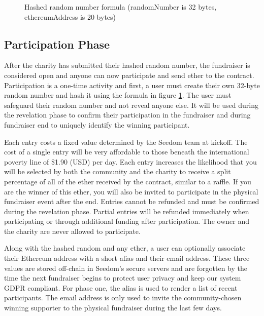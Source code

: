 \documentclass[11pt]{article}
\begin{document}
\begin{figure}[H]
\begin{center}
\caption{Hashed random number formula (randomNumber is 32 bytes, ethereumAddress is 20 bytes)}
\label{figure:hashedRandomNumberFormula}
\end{center}
\end{figure}

\subsection{Participation Phase}

After the charity has submitted their hashed random number, the fundraiser is considered open and anyone can now participate and send ether to the contract. Participation is a one-time activity and first, a user must create their own 32-byte random number and hash it using the formula in figure \ref{figure:hashedRandomNumberFormula}. The user must safeguard their random number and not reveal anyone else. It will be used during the revelation phase to confirm their participation in the fundraiser and during fundraiser end to uniquely identify the winning participant.

Each entry costs a fixed value determined by the Seedom team at kickoff. The cost of a single entry will be very affordable to those beneath the international poverty line of \$1.90 (USD) per day\cite{1}. Each entry increases the likelihood that you will be selected by both the community and the charity to receive a split percentage of all of the ether received by the contract, similar to a raffle. If you are the winner of this ether, you will also be invited to participate in the physical fundraiser event after the end. Entries cannot be refunded and must be confirmed during the revelation phase. Partial entries will be refunded immediately when participating or through additional funding after participation. The owner and the charity are never allowed to participate.

Along with the hashed random and any ether, a user can optionally associate their Ethereum address with a short alias and their email address. These three values are stored off-chain in Seedom's secure servers and are forgotten by the time the next fundraiser begins to protect user privacy and keep our system GDPR compliant. For phase one, the alias is used to render a list of recent participants. The email address is only used to invite the community-chosen winning supporter to the physical fundraiser during the last few days.
\end{document}
